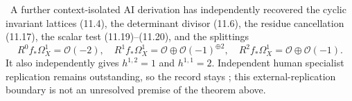 \begin{auditrecord}
\label{record:h12-direct-images}
\Open\ A further context-isolated AI derivation has independently recovered
the cyclic invariant lattices (11.4), the determinant divisor (11.6), the
residue cancellation (11.17), the scalar test (11.19)--(11.20), and the
splittings
\[
 R^0f_*\Omega_X^1=\mathcal O(-2),\quad
 R^1f_*\Omega_X^1=\mathcal O\oplus\mathcal O(-1)^{\oplus2},\quad
 R^2f_*\Omega_X^1=\mathcal O\oplus\mathcal O(-1).
\]
It also independently gives $h^{1,2}=1$ and $h^{1,1}=2$.  Independent human
specialist replication remains outstanding, so the record stays \Open; this
external-replication boundary is not an unresolved premise of the theorem
above.
\end{auditrecord}
